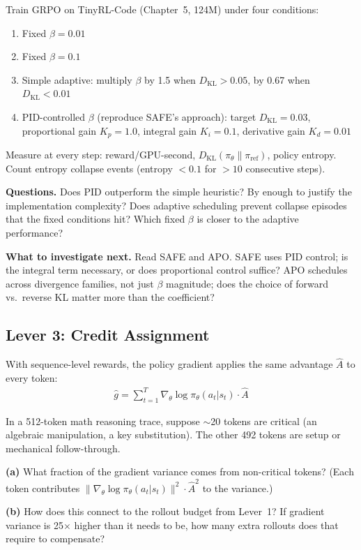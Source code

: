 \begin{exercise}

Train GRPO on TinyRL-Code (Chapter~5, 124M) under four conditions:
\begin{enumerate}[label=(\alph*)]
  \item Fixed $\beta = 0.01$
  \item Fixed $\beta = 0.1$
  \item Simple adaptive: multiply $\beta$ by 1.5 when $D_{\mathrm{KL}} > 0.05$, by 0.67 when $D_{\mathrm{KL}} < 0.01$
  \item PID-controlled $\beta$ (reproduce SAFE's approach): target $D_{\mathrm{KL}} = 0.03$, proportional gain $K_p = 1.0$, integral gain $K_i = 0.1$, derivative gain $K_d = 0.01$
\end{enumerate}

Measure at every step: reward/GPU-second, $D_{\mathrm{KL}}(\pi_\theta \| \pi_{\mathrm{ref}})$, policy entropy. Count entropy collapse events (entropy $< 0.1$ for $> 10$ consecutive steps).

\textbf{Questions.} Does PID outperform the simple heuristic? By enough to justify the implementation complexity? Does adaptive scheduling prevent collapse episodes that the fixed conditions hit? Which fixed $\beta$ is closer to the adaptive performance?

\textbf{What to investigate next.} Read SAFE and APO. SAFE uses PID control; is the integral term necessary, or does proportional control suffice? APO schedules across divergence families, not just $\beta$ magnitude; does the choice of forward vs.\ reverse KL matter more than the coefficient?
\end{exercise}

\subsection*{Lever 3: Credit Assignment}

\begin{thinkfirst}
With sequence-level rewards, the policy gradient applies the same advantage $\hat{A}$ to every token:
\begin{align*}
  \hat{g} = \sum_{t=1}^{T} \nabla_\theta \log \pi_\theta(a_t | s_t) \cdot \hat{A}
\end{align*}

In a 512-token math reasoning trace, suppose $\sim$20 tokens are critical (an algebraic manipulation, a key substitution). The other 492 tokens are setup or mechanical follow-through.

\textbf{(a)} What fraction of the gradient variance comes from non-critical tokens? (Each token contributes $\|\nabla_\theta \log \pi_\theta(a_t | s_t)\|^2 \cdot \hat{A}^2$ to the variance.)

\textbf{(b)} How does this connect to the rollout budget from Lever~1? If gradient variance is 25$\times$ higher than it needs to be, how many extra rollouts does that require to compensate?
\end{thinkfirst}

